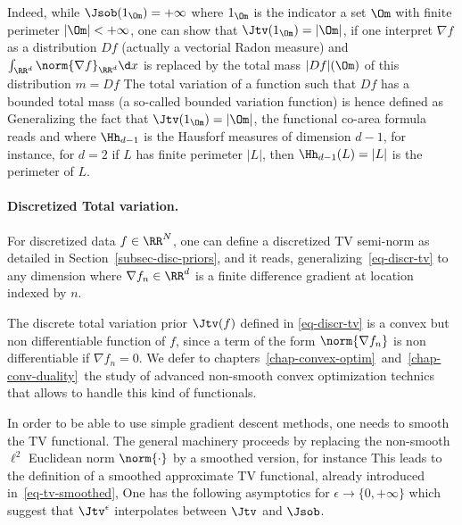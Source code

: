 Indeed, while $\Jsob(1_{\Om}) = +\infty$ where $1_{\Om}$ is the indicator a set $\Om$ with finite perimeter $|\Om|<+\infty$, one can show that $\Jtv(1_{\Om})=|\Om|$, if one interpret $\nabla f$ as a distribution $Df$ (actually a vectorial Radon measure) and $\int_{\RR^d} \norm{\nabla f}_{\RR^d} \d x$ is replaced by the total mass $|Df|(\Om)$ of this distribution $m=Df$
The total variation of a function such that $Df$ has a bounded total mass (a so-called bounded variation function) is hence defined as
Generalizing the fact that $\Jtv(1_\Om)=|\Om|$, the functional co-area formula reads
and where $\Hh_{d-1}$ is the Hausforf measures of dimension $d-1$, for instance, for $d=2$ if $L$ has finite perimeter $|L|$, then $\Hh_{d-1}(L)=|L|$ is the perimeter of $L$.


\paragraph{Discretized Total variation.}

For discretized data $f \in \RR^N$, one can define a discretized TV semi-norm as detailed in Section~\ref{subsec-disc-priors}, and it reads, generalizing~\eqref{eq-discr-tv} to any dimension
where $\nabla f_n \in \RR^d$ is a finite difference gradient at location indexed by $n$. 


The discrete total variation prior $\Jtv(f)$ defined in \eqref{eq-discr-tv} is a convex but non differentiable function of $f$, since a term of the form $\norm{\nabla f_n}$ is non differentiable if $\nabla f_n=0$.
%
We defer to chapters~\ref{chap-convex-optim} and~\ref{chap-conv-duality} the study of advanced non-smooth convex optimization technics that allows to handle this kind of functionals.

In order to be able to use simple gradient descent methods, one needs to smooth the TV functional. The general machinery proceeds by replacing the non-smooth $\ell^2$ Euclidean norm $\norm{\cdot}$ by a smoothed version, for instance
This leads to the definition of a smoothed approximate TV functional, already introduced in~\eqref{eq-tv-smoothed}, 
One has the following asymptotics for $\epsilon \rightarrow \{0,+\infty\}$
which suggest that $\Jtv^\epsilon$ interpolates between $\Jtv$ and $\Jsob$.

